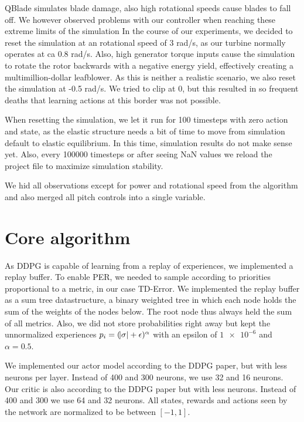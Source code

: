 \documentclass[hyperref,german,beleg]{cgvpub}
\begin{document}
QBlade simulates blade damage, also high rotational speeds cause blades to fall off. We however observed problems with our controller when reaching these extreme limits of the simulation In the course of our experiments, we decided to reset the simulation at an rotational speed of 3 rad/s, as our turbine normally operates at ca 0.8 rad/s. Also, high generator torque inputs cause the simulation to rotate the rotor backwards with a negative energy yield, effectively creating a multimillion-dollar leafblower. As this is neither a realistic scenario, we also reset the simulation at -0.5 rad/s. We tried to clip at 0, but this resulted in so frequent deaths that learning actions at this border was not possible.

When resetting the simulation, we let it run for 100 timesteps with zero action and state, as the elastic structure needs a bit of time to move from simulation default to elastic equilibrium. In this time, simulation results do not make sense yet. Also, every 100000 timesteps or after seeing NaN values we reload the project file to maximize simulation stability.

We hid all observations except for power and rotational speed from the algorithm and also merged all pitch controls into a single variable.

\section{Core algorithm}

As DDPG is capable of learning from a replay of experiences, we implemented a replay buffer. To enable \ac{PER}, we needed to sample according to priorities proportional to a metric, in our case \ac{TD-Error}. We implemented the replay buffer as a sum tree datastructure, a binary weighted tree in which each node holds the sum of the weights of the nodes below. The root node thus always held the sum of all metrics. Also, we did not store probabilities right away but kept the unnormalized experiences $p_i = (\abs{\sigma} + \epsilon)^{\alpha}$ with an epsilon of $\num{1e-6}$ and $\alpha = 0.5$. 

We implemented our actor model according to the \ac{DDPG} paper, but with less neurons per layer. Instead of 400 and 300 neurons, we use 32 and 16 neurons. Our critic is also according to the \ac{DDPG} paper but with less neurons. Instead of 400 and 300 we use 64 and 32 neurons. All states, rewards and actions seen by the network are normalized to be between $[-1, 1]$.
\end{document}
